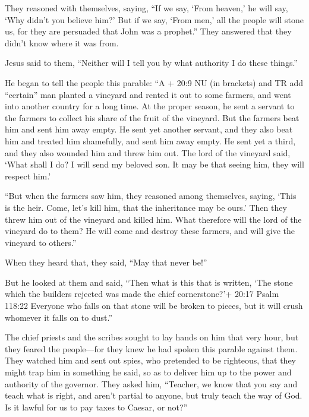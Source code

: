  They reasoned with themselves, saying, ``If we say, `From
heaven,' he will say, `Why didn't you believe him?'  But if
we say, `From men,' all the people will stone us, for they are persuaded
that John was a prophet.''  They answered that they didn't
know where it was from.

 Jesus said to them, ``Neither will I tell you by what
authority I do these things.''

 He began to tell the people this parable: ``A + 20:9 NU (in
brackets) and TR add ``certain'' man planted a vineyard and rented it
out to some farmers, and went into another country for a long time.
 At the proper season, he sent a servant to the farmers to
collect his share of the fruit of the vineyard. But the farmers beat him
and sent him away empty.  He sent yet another servant, and
they also beat him and treated him shamefully, and sent him away empty.
 He sent yet a third, and they also wounded him and threw
him out.  The lord of the vineyard said, `What shall I do?
I will send my beloved son. It may be that seeing him, they will respect
him.'

 ``But when the farmers saw him, they reasoned among
themselves, saying, `This is the heir. Come, let's kill him, that the
inheritance may be ours.'  Then they threw him out of the
vineyard and killed him. What therefore will the lord of the vineyard do
to them?  He will come and destroy these farmers, and will
give the vineyard to others.''

When they heard that, they said, ``May that never be!''

 But he looked at them and said, ``Then what is this that
is written, `The stone which the builders rejected was made the chief
cornerstone?'+ 20:17 Psalm 118:22  Everyone who falls on
that stone will be broken to pieces, but it will crush whomever it falls
on to dust.''

 The chief priests and the scribes sought to lay hands on
him that very hour, but they feared the people---for they knew he had
spoken this parable against them.  They watched him and
sent out spies, who pretended to be righteous, that they might trap him
in something he said, so as to deliver him up to the power and authority
of the governor.  They asked him, ``Teacher, we know that
you say and teach what is right, and aren't partial to anyone, but truly
teach the way of God.  Is it lawful for us to pay taxes to
Caesar, or not?''

